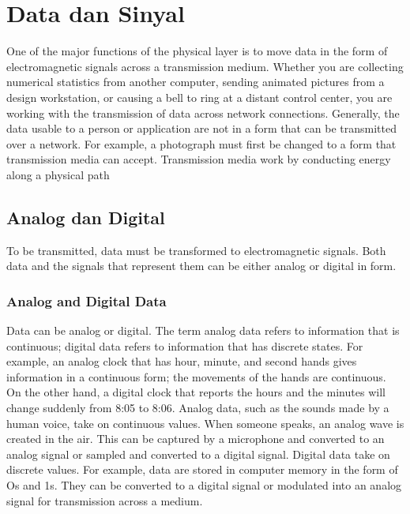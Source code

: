 \chapter{Data dan Sinyal}
One of the major functions of the physical layer is to move data in the form of electromagnetic signals across a transmission medium. Whether you are collecting numerical statistics from another computer, sending animated pictures from a design workstation, or causing a bell to ring at a distant control center, you are working with the transmission of data across network connections. Generally, the data usable to a person or application are not in a form that can be transmitted over a network. For example, a photograph must first be changed to a form that transmission media can accept. Transmission media work by conducting energy along a physical path

\section{Analog dan Digital}
To be transmitted, data must be transformed to electromagnetic signals. Both data and the signals that represent them can be either analog or digital in form.

\subsection{Analog and Digital Data}
Data can be analog or digital. The term analog data refers to information that is continuous; digital data refers to information that has discrete states. For example, an analog clock that has hour, minute, and second hands gives information in a continuous form; the movements of the hands are continuous. On the other hand, a digital clock that reports the hours and the minutes will change suddenly from 8:05 to 8:06. Analog data, such as the sounds made by a human voice, take on continuous values. When someone speaks, an analog wave is created in the air. This can be captured by a microphone and converted to an analog signal or sampled and converted to a digital signal. Digital data take on discrete values. For example, data are stored in computer memory in the form of Os and 1s. They can be converted to a digital signal or modulated into an analog signal for transmission across a medium.

